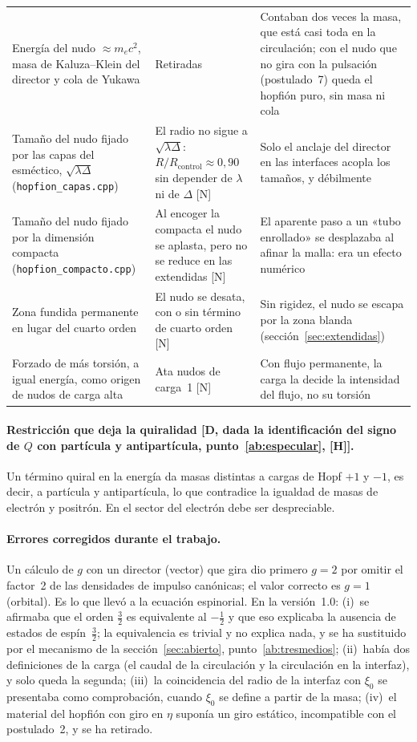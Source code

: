 \documentclass[11pt,a4paper]{article}
\newcommand{\st}[1]{\textup{[#1]}}
\newcommand{\prog}[1]{\texttt{#1}}
\newcommand{\apartado}[1]{\paragraph{#1}}
\begin{document}
{\begin{xltabular}{\textwidth}{@{}Y Y Y@{}}
\addlinespace
Energía del nudo $\approx m_ec^2$, masa de Kaluza--Klein del director y cola de Yukawa & Retiradas & Contaban dos veces la masa, que está casi toda en la circulación; con el nudo que no gira con la pulsación (postulado~7) queda el hopfión puro, sin masa ni cola \\
\addlinespace
Tamaño del nudo fijado por las capas del esméctico, $\sqrt{\lambda\Delta}$ (\prog{hopfion\_capas.cpp}) & El radio no sigue a $\sqrt{\lambda\Delta}$: $R/R_{\mathrm{control}}\approx0,90$ sin depender de $\lambda$ ni de $\Delta$ \st{N} & Solo el anclaje del director en las interfaces acopla los tamaños, y débilmente \\
\addlinespace
Tamaño del nudo fijado por la dimensión compacta (\prog{hopfion\_compacto.cpp}) & Al encoger la compacta el nudo se aplasta, pero no se reduce en las extendidas \st{N} & El aparente paso a un «tubo enrollado» se desplazaba al afinar la malla: era un efecto numérico \\
\addlinespace
Zona fundida permanente en lugar del cuarto orden & El nudo se desata, con o sin término de cuarto orden \st{N} & Sin rigidez, el nudo se escapa por la zona blanda (sección~\ref{sec:extendidas}) \\
\addlinespace
Forzado de más torsión, a igual energía, como origen de nudos de carga alta & Ata nudos de carga~1 \st{N} & Con flujo permanente, la carga la decide la intensidad del flujo, no su torsión \\
\end{xltabular}
}

\apartado{Restricción que deja la quiralidad \st{D, dada la identificación del signo de $Q$ con partícula y antipartícula, punto~\ref{ab:especular}, \st{H}}.} Un término quiral en la energía da masas distintas a cargas de Hopf $+1$ y $-1$, es decir, a partícula y antipartícula, lo que contradice la igualdad de masas de electrón y positrón. En el sector del electrón debe ser despreciable.

\apartado{Errores corregidos durante el trabajo.} Un cálculo de $g$ con un director (vector) que gira dio primero $g=2$ por omitir el factor~2 de las densidades de impulso canónicas; el valor correcto es $g=1$ (orbital). Es lo que llevó a la ecuación espinorial. En la versión~1.0: (i)~se afirmaba que el orden $\tfrac32$ es equivalente al $-\tfrac12$ y que eso explicaba la ausencia de estados de espín~$\tfrac32$; la equivalencia es trivial y no explica nada, y se ha sustituido por el mecanismo de la sección~\ref{sec:abierto}, punto~\ref{ab:tresmedios}; (ii)~había dos definiciones de la carga (el caudal de la circulación y la circulación en la interfaz), y solo queda la segunda; (iii)~la coincidencia del radio de la interfaz con $\xi_0$ se presentaba como comprobación, cuando $\xi_0$ se define a partir de la masa; (iv)~el material del hopfión con giro en $\eta$ suponía un giro estático, incompatible con el postulado~2, y se ha retirado.
\end{document}
